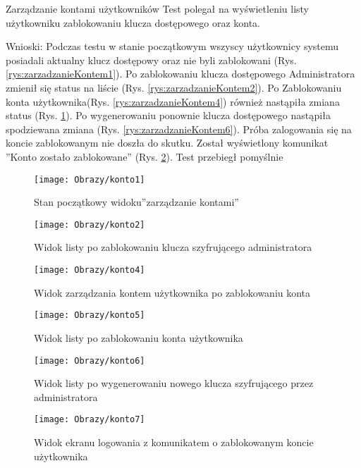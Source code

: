 \begin{enumerate*}
\newpage
	\item Zarządzanie kontami użytkowników
		Test polegał na wyświetleniu listy użytkowniku zablokowaniu klucza dostępowego oraz konta.
		
		Wnioski: Podczas testu w stanie początkowym wszyscy użytkownicy systemu posiadali aktualny klucz dostępowy oraz nie byli zablokowani (Rys. \ref{rys:zarzadzanieKontem1}). Po zablokowaniu klucza dostępowego  Administratora zmienił się status na liście (Rys. \ref{rys:zarzadzanieKontem2}). Po Zablokowaniu konta użytkownika(Rys. \ref{rys:zarzadzanieKontem4}) również nastąpiła zmiana  status  (Rys. \ref{rys:zarzadzanieKontem5}). Po wygenerowaniu ponownie klucza dostępowego nastąpiła spodziewana zmiana (Rys. \ref{rys:zarzadzanieKontem6}). Próba zalogowania się na koncie zablokowanym nie doszła do skutku. Został wyświetlony komunikat ''Konto zostało zablokowane'' (Rys. \ref{rys:zarzadzanieKontem7}). Test przebiegł pomyślnie		
		
				\begin{figure}[ht!]
					\centering
					\begin{minipage}{0.23\textwidth}
						\texttt{[image: Obrazy/konto1]}
						\caption{Stan początkowy widoku''zarządzanie kontami'' }
						\label{rys:zarzadzanieKontem1}
					\end{minipage}
					\hspace{0.01\textwidth}
				\begin{minipage}{0.23\textwidth}
					\texttt{[image: Obrazy/konto2]}
					\caption{Widok listy po zablokowaniu klucza szyfrującego administratora }
					\label{rys:zarzadzanieKontem2}
				\end{minipage}
				\hspace{0.01\textwidth}
			\begin{minipage}{0.23\textwidth}
				\texttt{[image: Obrazy/konto4]}
				\caption{Widok zarządzania kontem użytkownika po zablokowaniu konta }
				\label{rys:zarzadzanieKontem4}
			\end{minipage}
			\hspace{0.01\textwidth}
			\begin{minipage}{0.23\textwidth}
				\texttt{[image: Obrazy/konto5]}
				\caption{Widok listy po zablokowaniu konta użytkownika}
				\label{rys:zarzadzanieKontem5}
			\end{minipage}
\end{figure}
\begin{figure}
	\centering
			\begin{minipage}{0.3\textwidth}
			\texttt{[image: Obrazy/konto6]}
			\caption{Widok listy po wygenerowaniu nowego klucza szyfrującego przez administratora}
			\label{rys:zarzadzanieKontem6}
		\end{minipage}
		\hspace{0.05\textwidth}
		\begin{minipage}{0.3\textwidth}
		\texttt{[image: Obrazy/konto7]}
		\caption{Widok ekranu logowania z komunikatem o zablokowanym koncie użytkownika}
		\label{rys:zarzadzanieKontem7}
	\end{minipage}	
		\end{figure}
		

\end{enumerate*}
